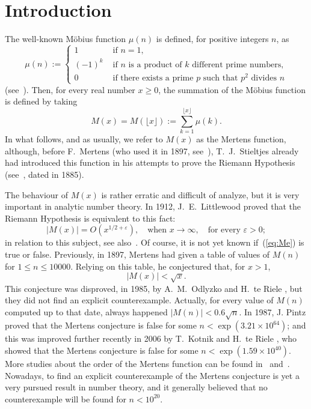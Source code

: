 \documentclass[10pt]{amsart}
\begin{document}
\section{Introduction}

The well-known M\"obius function $\mu(n)$ is defined, for positive integers $n$, as
$$
\mu(n) := \left\{
\begin{array}{ll}
1 & \mbox{ if } n=1,\\
(-1)^k & \mbox{ if $n$ is a product of $k$ different prime numbers,}\\
0 & \mbox{ if there exists a prime $p$ such that $p^2$ divides $n$}
\end{array}\right.
$$
(see~\cite[Chapter~2]{Ap}).
Then, for every real number $x\geq 0$, the summation of the M\"obius function
is defined by taking
\begin{equation*}
M(x) = M(\lfloor x \rfloor) := \sum_{k=1}^{\lfloor x \rfloor}\mu(k).
\end{equation*}
In what follows, and as usually, we refer to $M(x)$ as the Mertens function,
although, before F.~Mertens (who used it in 1897, see~\cite{Mer}), 
T.~J.~Stieltjes already had introduced this function in his attempts to prove the Riemann Hypothesis
(see~\cite[Lettre 79, p.~160--164]{Her}, dated in 1885).

The behaviour of $M(x)$ is rather erratic and difficult of analyze,
but it is very important in analytic number theory.
In 1912, J.~E.~Littlewood \cite{Lit} proved that
the Riemann Hypothesis is equivalent to this fact:
\begin{equation}
\label{eq:Me}
|M(x)| = O(x^{1/2+\varepsilon}), \quad\mbox{when } x\to \infty,
\quad\mbox{for every } \varepsilon>0;
\end{equation}
in relation to this subject, see also~\cite{Tit}. Of course,
it is not yet known if~(\ref{eq:Me}) is true or false.
%
Previously, in 1897, Mertens \cite{Mer} had given a table of values
of $M(n)$ for $1\leq n\leq 10000$. Relying on this table, he conjectured that,
for $x>1$,
$$
|M(x)| < \sqrt{x}.
$$
This conjecture was disproved, in 1985, by A.~M.~Odlyzko and H.~te Riele
\cite{OdRie}, but they did not find an explicit counterexample. Actually,
for every value of $M(n)$ computed up to that date, always happened
$|M(n)| < 0.6 \sqrt n$.
In 1987, J. Pintz \cite{Pi} proved that the Mertens conjecture is false for some 
$n < \exp(3.21 \times 10^{64})$;
and this was improved further recently in 2006 by T.~Kotnik and H.~te Riele \cite{KoRie},
who showed that the Mertens conjecture is false for some $n < \exp(1.59 \times 10^{40})$.
More studies about the order of the Mertens function can be found in~\cite{Ma} and~\cite{KoLu}.
Nowadays, to find an explicit counterexample of the Mertens conjecture
is yet a very pursued result in number theory, and it generally believed
that no counterexample will be found for $n < 10^{20}$.
\end{document}

